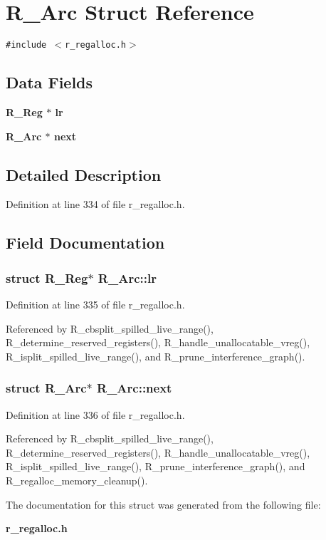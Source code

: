 \section{R\_\-Arc Struct Reference}
\label{structR__Arc}
{\tt \#include $<$r\_\-regalloc.h$>$}

\subsection*{Data Fields}
\begin{CompactItemize}
\item 
\bf{R\_\-Reg} $\ast$ \bf{lr}
\item 
\bf{R\_\-Arc} $\ast$ \bf{next}
\end{CompactItemize}


\subsection{Detailed Description}




Definition at line 334 of file r\_\-regalloc.h.

\subsection{Field Documentation}
\subsubsection{\setlength{\rightskip}{0pt plus 5cm}struct \bf{R\_\-Reg}$\ast$ \bf{R\_\-Arc::lr}}\label{structR__Arc_4abb138c60e6c7775477990063e8a993}




Definition at line 335 of file r\_\-regalloc.h.

Referenced by R\_\-cbsplit\_\-spilled\_\-live\_\-range(), R\_\-determine\_\-reserved\_\-registers(), R\_\-handle\_\-unallocatable\_\-vreg(), R\_\-isplit\_\-spilled\_\-live\_\-range(), and R\_\-prune\_\-interference\_\-graph().
\subsubsection{\setlength{\rightskip}{0pt plus 5cm}struct \bf{R\_\-Arc}$\ast$ \bf{R\_\-Arc::next}}\label{structR__Arc_8bf9f0a2f757a438dd1c2b7c109203be}




Definition at line 336 of file r\_\-regalloc.h.

Referenced by R\_\-cbsplit\_\-spilled\_\-live\_\-range(), R\_\-determine\_\-reserved\_\-registers(), R\_\-handle\_\-unallocatable\_\-vreg(), R\_\-isplit\_\-spilled\_\-live\_\-range(), R\_\-prune\_\-interference\_\-graph(), and R\_\-regalloc\_\-memory\_\-cleanup().

The documentation for this struct was generated from the following file:\begin{CompactItemize}
\item 
\bf{r\_\-regalloc.h}\end{CompactItemize}
